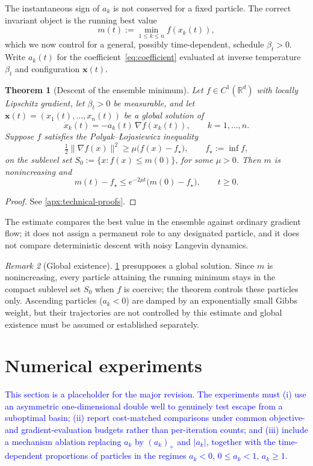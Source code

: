 \documentclass{article}
\theoremstyle{plain}
\newtheorem{theorem}{Theorem}[section]
\theoremstyle{definition}
\theoremstyle{remark}
\newtheorem{remark}[theorem]{Remark}
\newcommand{\R}{\mathbb{R}}
\newcommand{\xx}{\mathbf{x}}
\begin{document}
The instantaneous sign of \(a_k\) is not conserved for a fixed particle. The correct invariant object is the running best value
\[
    m(t):=\min_{1\le k\le n}f(x_k(t)),
\]
which we now control for a general, possibly time-dependent, schedule \(\beta_t>0\). Write \(a_k(t)\) for the coefficient~\eqref{eq:coefficient} evaluated at inverse temperature \(\beta_t\) and configuration \(\xx(t)\).

\begin{theorem}[Descent of the ensemble minimum]
\label{thm:ensemble-min}
Let \(f\in C^1(\R^d)\) with locally Lipschitz gradient, let \(\beta_t>0\) be measurable, and let \(\xx(t)=(x_1(t),\dots,x_n(t))\) be a global solution of
\[
    \dot x_k(t)=-a_k(t)\,\nabla f(x_k(t)),\qquad k=1,\dots,n.
\]
Suppose \(f\) satisfies the Polyak--\L{}ojasiewicz inequality
\[
    \tfrac12\|\nabla f(x)\|^2\ge\mu\bigl(f(x)-f_\star\bigr),
    \qquad f_\star:=\inf f,
\]
on the sublevel set \(S_0:=\{x:f(x)\le m(0)\}\), for some \(\mu>0\). Then \(m\) is nonincreasing and
\[
    m(t)-f_\star\le e^{-2\mu t}\bigl(m(0)-f_\star\bigr),\qquad t\ge0.
\]
\end{theorem}

\begin{proof}
See \ref{apx:technical-proofs}.
\end{proof}

The estimate compares the best value in the ensemble against ordinary gradient flow; it does not assign a permanent role to any designated particle, and it does not compare deterministic descent with noisy Langevin dynamics.

\begin{remark}[Global existence]
\label{rem:global-existence}
\ref{thm:ensemble-min} presupposes a global solution. Since \(m\) is nonincreasing, every particle attaining the running minimum stays in the compact sublevel set \(S_0\) when \(f\) is coercive; the theorem controls these particles only. Ascending particles (\(a_k<0\)) are damped by an exponentially small Gibbs weight, but their trajectories are not controlled by this estimate and global existence must be assumed or established separately.
\end{remark}

\section{Numerical experiments}
\label{sec:numerical-experiments}

\textcolor{blue}{This section is a placeholder for the major revision. The experiments must (i) use an asymmetric one-dimensional double well to genuinely test escape from a suboptimal basin; (ii) report cost-matched comparisons under common objective- and gradient-evaluation budgets rather than per-iteration counts; and (iii) include a mechanism ablation replacing \(a_k\) by \((a_k)_+\) and \(|a_k|\), together with the time-dependent proportions of particles in the regimes \(a_k<0\), \(0\le a_k<1\), \(a_k\ge1\).}
\end{document}
